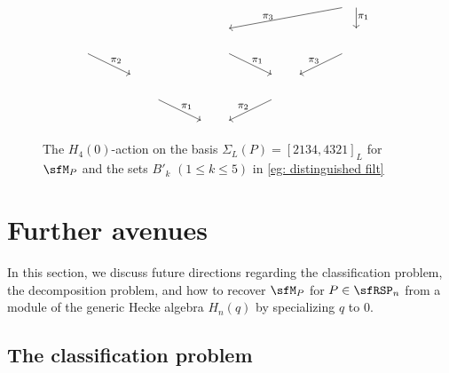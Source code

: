 \documentclass[12pt, reqno]{amsart}
\theoremstyle{definition}
\numberwithin{equation}{section} \numberwithin{figure}{section}
\numberwithin{table}{section}
\begin{document}
\begin{figure}[t]
\[\begin{tikzpicture}
\draw[->] (1.8*\hp, -2.25*\vp) -- (0.2*\hp, -2.7*\vp);
\node at (0.75*\hp, -2.45*\vp) {\footnotesize $\pi_3$};
\draw[->] (2*\hp, -2.25*\vp) -- (2*\hp, -2.7*\vp);
\node at (2.1*\hp, -2.45*\vp) {\footnotesize $\pi_1$};

\draw[->] (-1.8*\hp, -3.25*\vp) -- (-1.2*\hp, -3.7*\vp);
\node at (-1.4*\hp, -3.4*\vp) {\footnotesize $\pi_2$};

\draw[->] (0.2*\hp, -3.25*\vp) -- (0.8*\hp, -3.7*\vp);
\node at (0.6*\hp, -3.4*\vp) {\footnotesize $\pi_1$};
\draw[->] (1.8*\hp, -3.25*\vp) -- (1.2*\hp, -3.7*\vp);
\node at (1.4*\hp, -3.4*\vp) {\footnotesize $\pi_3$};

\draw[->] (-0.8*\hp, -4.25*\vp) -- (-0.2*\hp, -4.7*\vp);
\node at (-0.4*\hp, -4.4*\vp) {\footnotesize $\pi_1$};
\draw[->] (0.8*\hp, -4.25*\vp) -- (0.2*\hp, -4.7*\vp);
\node at (0.4*\hp, -4.4*\vp) {\footnotesize $\pi_2$};
\end{tikzpicture}
\]
\caption{The $H_4(0)$-action on the basis $\Sigma_L(P) = [2134, 4321]_L$ for $\sfM_P$ and the sets $B'_k$ $(1 \leq k \leq 5)$ in \cref{eg: distinguished filt}}
\label{fig: figure for example}
\end{figure}




































\section{Further avenues}\label{sec: Final remark}


In this section, we discuss future directions regarding the classification problem, the decomposition problem, and how to recover $\sfM_P$ for $P \in \sfRSP_n$ from a module of the generic Hecke algebra $H_n(q)$ by specializing $q$ to $0$.





\subsection{The classification problem}\label{subsec: classification}
\end{document}
